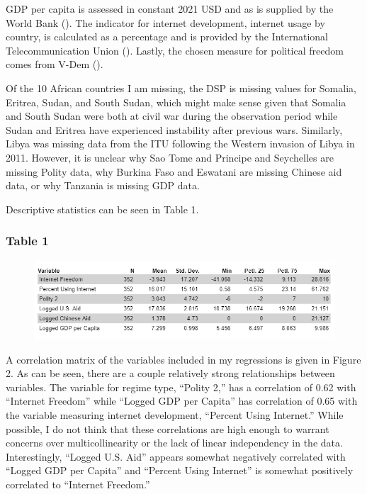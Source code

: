 \documentclass[12pt]{article}
\begin{document}
GDP per capita is assessed in constant 2021 USD and as is supplied by the World Bank (\cite{bank2022}). The indicator for internet development, internet usage by country, is calculated as a percentage and is provided by the International Telecommunication Union (\cite{itu2022}). Lastly, the chosen measure for political freedom comes from V-Dem (\cite{coppedge2022a}).

Of the 10 African countries I am missing, the DSP is missing values for Somalia, Eritrea, Sudan, and South Sudan, which might make sense given that Somalia and South Sudan were both at civil war during the observation period while Sudan and Eritrea have experienced instability after previous wars. Similarly, Libya was missing data from the ITU following the Western invasion of Libya in 2011. However, it is unclear why Sao Tome and Principe and Seychelles are missing Polity data, why Burkina Faso and Eswatani are missing Chinese aid data, or why Tanzania is missing GDP data.

\pagebreak
Descriptive statistics can be seen in Table 1.

\subsubsection*{Table 1}
\begin{figure}[htbp]
    \includegraphics[scale=1.1]{628table2.png}
\end{figure}

A correlation matrix of the variables included in my regressions is given in Figure 2. As can be seen, there are a couple relatively strong relationships between variables. The variable for regime type, ``Polity 2,'' has a correlation of 0.62 with ``Internet Freedom'' while ``Logged GDP per Capita'' has correlation of 0.65 with the variable measuring internet development, ``Percent Using Internet.'' While possible, I do not think that these correlations are high enough to warrant concerns over multicollinearity or the lack of linear independency in the data. Interestingly, ``Logged U.S. Aid'' appears somewhat negatively correlated with ``Logged GDP per Capita'' and ``Percent Using Internet'' is somewhat positively correlated to ``Internet Freedom.''
\end{document}
